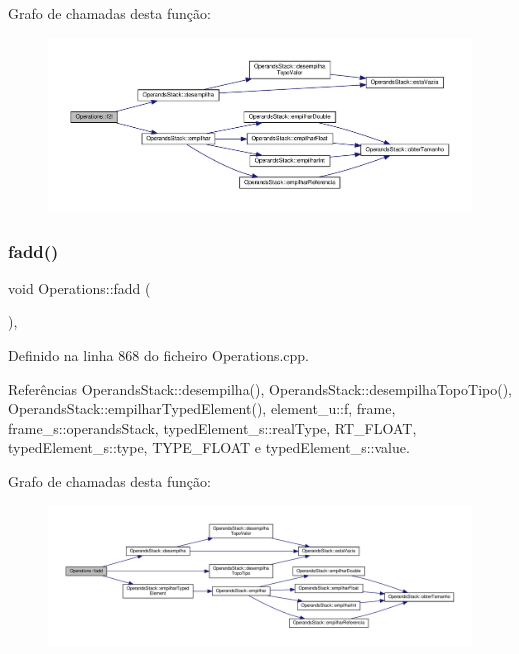 Grafo de chamadas desta função\+:\nopagebreak
\begin{figure}[H]
\begin{center}
\leavevmode
\includegraphics[width=350pt]{classOperations_a175cdab8d092bdd6c27bace9efbcd27e_cgraph}
\end{center}
\end{figure}
\mbox{\label{classOperations_a01a07c700f0f1574552437b76f3fdcb4}} 
\subsubsection{\texorpdfstring{fadd()}{fadd()}}
{\footnotesize\ttfamily void Operations\+::fadd (\begin{DoxyParamCaption}{ }\end{DoxyParamCaption})\hspace{0.3cm}{\ttfamily [static]}, {\ttfamily [private]}}



Definido na linha 868 do ficheiro Operations.\+cpp.



Referências Operands\+Stack\+::desempilha(), Operands\+Stack\+::desempilha\+Topo\+Tipo(), Operands\+Stack\+::empilhar\+Typed\+Element(), element\+\_\+u\+::f, frame, frame\+\_\+s\+::operands\+Stack, typed\+Element\+\_\+s\+::real\+Type, R\+T\+\_\+\+F\+L\+O\+AT, typed\+Element\+\_\+s\+::type, T\+Y\+P\+E\+\_\+\+F\+L\+O\+AT e typed\+Element\+\_\+s\+::value.

Grafo de chamadas desta função\+:\nopagebreak
\begin{figure}[H]
\begin{center}
\leavevmode
\includegraphics[width=350pt]{classOperations_a01a07c700f0f1574552437b76f3fdcb4_cgraph}
\end{center}
\end{figure}
\mbox{\label{classOperations_ac22c02d88fa894cafd3f53c54d91409d}} 
